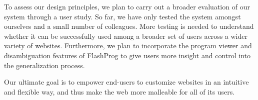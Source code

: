\documentclass[sigconf,10pt]{acmart}
\begin{document}
To assess our design principles, we plan to carry out a broader
evaluation of our system through a user study. So far, we have only
tested the system amongst ourselves and a small number of colleagues.
More testing is needed to understand whether it can be successfully used
among a broader set of users across a wider variety of websites.
Furthermore, we plan to incorporate the program viewer and
disambiguation features of FlashProg \citep{mayer2015} to give users
more insight and control into the generalization process.

Our ultimate goal is to empower end-users to customize websites in an
intuitive and flexible way, and thus make the web more malleable for all
of its users.




\end{document}
